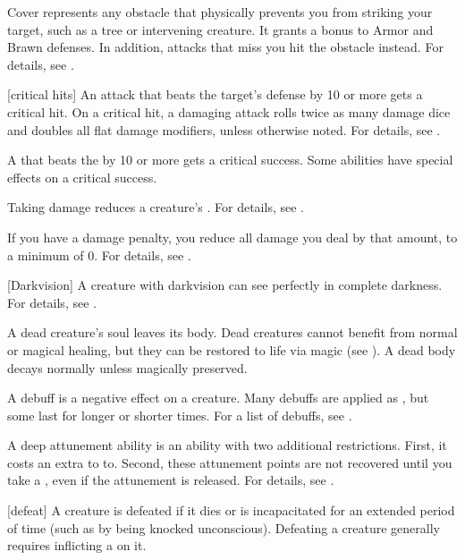  Cover represents any obstacle that physically prevents you from striking your target, such as a tree or intervening creature.
It grants a  bonus to Armor and Brawn defenses.
In addition, attacks that miss you hit the obstacle instead.
For details, see .

[critical hits] An attack that beats the target's defense by 10 or more gets a critical hit.
On a critical hit, a damaging attack rolls twice as many damage dice and doubles all flat damage modifiers, unless otherwise noted.
For details, see .

 A  that beats the  by 10 or more gets a critical success.
Some abilities have special effects on a critical success.

 Taking damage reduces a creature's .
For details, see .

 If you have a damage penalty, you reduce all damage you deal by that amount, to a minimum of 0.
For details, see .

[Darkvision] A creature with darkvision can see perfectly in complete darkness.
For details, see .

 A dead creature's soul leaves its body. Dead creatures cannot benefit from normal or magical healing, but they can be restored to life via magic (see ). A dead body decays normally unless magically preserved.

 A debuff is a negative effect on a creature.
Many debuffs are applied as , but some last for longer or shorter times.
For a list of debuffs, see .

 A deep attunement ability is an  ability with two additional restrictions.
First, it costs an extra  to  to.
Second, these attunement points are not recovered until you take a , even if the attunement is released.
For details, see .

[defeat] A creature is defeated if it dies or is incapacitated for an extended period of time (such as by being knocked unconscious).
Defeating a creature generally requires inflicting a  on it.

